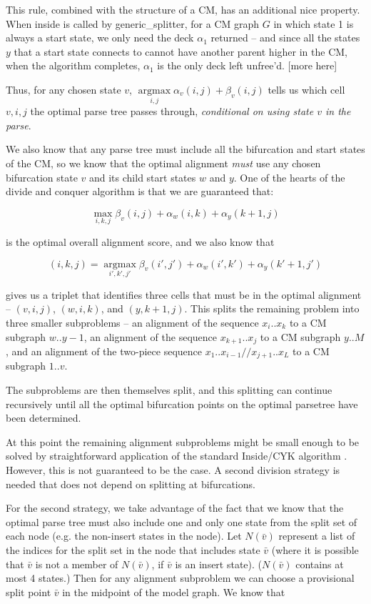 \documentclass[11pt]{article}
\def\argmax{\mathop{\mathrm{argmax}}\limits}
\begin{document}
This rule, combined with the structure of a CM, has an additional nice
property. When inside is called by generic\_splitter, for a CM graph
$G$ in which state 1 is always a start state, we only need the deck
$\alpha_1$ returned -- and since all the states $y$ that a start state
connects to cannot have another parent higher in the CM, when the
algorithm completes, $\alpha_1$ is the only deck left unfree'd.
[more here]



Thus, for any chosen state $v$, $\argmax_{i,j} \alpha_{v}(i,j) +
\beta_{v}(i,j)$ tells us which cell $v,i,j$ the optimal parse tree
passes through, \emph{conditional on using state $v$ in the parse}.

We also know that any parse tree must include all the bifurcation and
start states of the CM, so we know that the optimal alignment
\emph{must} use any chosen bifurcation state $v$ and its child start
states $w$ and $y$. One of the hearts of the divide and conquer
algorithm is that we are guaranteed that:

\[
   \max_{i,k,j} \beta_{v}(i,j) + \alpha_{w}(i,k) + \alpha_{y}(k+1,j)
\]

is the optimal overall alignment score, and we also know that

\[
      (i,k,j) = \argmax_{i',k',j'}  \beta_{v}(i',j') +
      \alpha_{w}(i',k') + \alpha_{y}(k'+1,j') 
\]

gives us a triplet that identifies three cells that must be in the
optimal alignment -- $(v,i,j)$, $(w,i,k)$, and $(y,k+1,j)$. This
splits the remaining problem into three smaller subproblems -- an
alignment of the sequence $x_{i}..x_{k}$ to a CM subgraph $w..y-1$, an
alignment of the sequence $x_{k+1}..x_{j}$ to a CM subgraph $y..M$,
and an alignment of the two-piece sequence
$x_1..x_{i-1}//x_{j+1}..x_L$ to a CM subgraph $1..v$.

The subproblems are then themselves split, and this splitting can
continue recursively until all the optimal bifurcation points on the
optimal parsetree have been determined.

At this point the remaining alignment subproblems might be small
enough to be solved by straightforward application of the standard
Inside/CYK algorithm . However, this is not guaranteed to be the
case. A second division strategy is needed that does not depend on
splitting at bifurcations.

For the second strategy, we take advantage of the fact that we know
that the optimal parse tree must also include one and only one state
from the split set of each node (e.g. the non-insert states in the
node). Let $N(\bar{v})$ represent a list of the indices for the split
set in the node that includes state $\bar{v}$ (where it is possible
that $\bar{v}$ is not a member of $N(\bar{v})$, if $\bar{v}$ is an
insert state). ($N(\bar{v})$ contains at most 4 states.) Then for any
alignment subproblem we can choose a provisional split point $\bar{v}$
in the midpoint of the model graph. We know that
\end{document}
